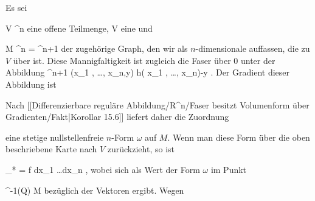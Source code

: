 {

Es sei

\mavergleichskette
{\vergleichskette
{ V
}
{ \subseteq }{ \R^n
}
{  }{
}
{    }{
}
{   }{
}
}
{}{}{}
eine offene Teilmenge,
 { V } {\R
} {}
eine
und

\mavergleichskette
{\vergleichskette
{M
}
{ \subset }{ \R^n \times \R
}
{ = }{\R^{n+1}
}
{    }{
}
{   }{
}
}
{}{}{}
der zugehörige Graph, den wir als $n$-dimensionale
auffassen, die zu $V$ über
ist. Diese Mannigfaltigkeit ist zugleich die Faser über $0$ unter der Abbildung
\maabbeledisp {\varphi} {\R^{n+1}} {\R
} {(x_1 , \ldots , x_n,y)} { h( x_1 , \ldots , x_n)-y
} {.}
Der Gradient dieser Abbildung ist

 {  }

Nach
[[Differenzierbare reguläre Abbildung/R^n/Faser besitzt Volumenform über Gradienten/Fakt|Korollar 15.6]]
liefert daher die Zuordnung

 {  }

eine stetige nullstellenfreie $n$-Form $\omega$ auf $M$. Wenn man diese Form über die oben beschriebene
 {} {}
Karte nach $V$ zurückzieht, so ist

\mavergleichskette
{\vergleichskette
{ \alpha_*\omega
}
{ = }{ f dx_1 \wedge \ldots \wedge dx_n
}
{  }{
}
{    }{
}
{   }{
}
}
{}{}{,}
wobei sich
 als Wert der Form $\omega$ im Punkt

\mavergleichskette
{\vergleichskette
{ \alpha^{-1}(Q)
}
{ \in }{ M
}
{  }{
}
{    }{
}
{   }{
}
}
{}{}{}
bezüglich der Vektoren
 ergibt. Wegen

}
